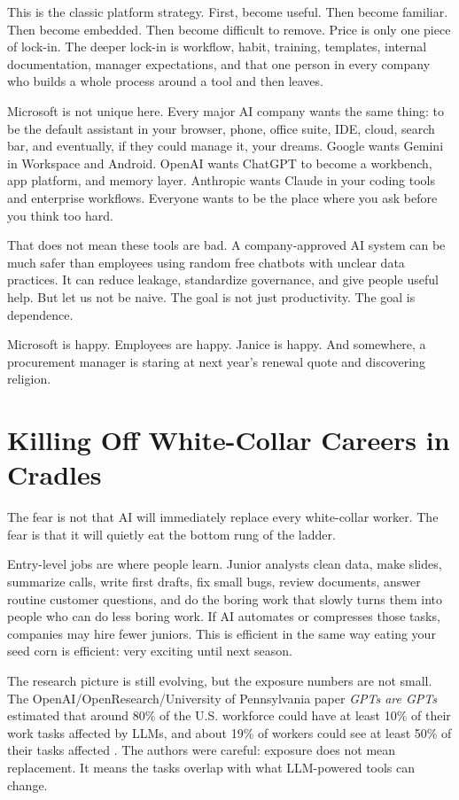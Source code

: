 \documentclass[12pt,oneside]{book}
\begin{document}
This is the classic platform strategy. First, become useful. Then become familiar. Then become embedded. Then become difficult to remove. Price is only one piece of lock-in. The deeper lock-in is workflow, habit, training, templates, internal documentation, manager expectations, and that one person in every company who builds a whole process around a tool and then leaves.

Microsoft is not unique here. Every major AI company wants the same thing: to be the default assistant in your browser, phone, office suite, IDE, cloud, search bar, and eventually, if they could manage it, your dreams. Google wants Gemini in Workspace and Android. OpenAI wants ChatGPT to become a workbench, app platform, and memory layer. Anthropic wants Claude in your coding tools and enterprise workflows. Everyone wants to be the place where you ask before you think too hard.

That does not mean these tools are bad. A company-approved AI system can be much safer than employees using random free chatbots with unclear data practices. It can reduce leakage, standardize governance, and give people useful help. But let us not be naive. The goal is not just productivity. The goal is dependence.

Microsoft is happy. Employees are happy. Janice is happy. And somewhere, a procurement manager is staring at next year's renewal quote and discovering religion.

\chapter{Killing Off White-Collar Careers in Cradles}

The fear is not that AI will immediately replace every white-collar worker. The fear is that it will quietly eat the bottom rung of the ladder.

Entry-level jobs are where people learn. Junior analysts clean data, make slides, summarize calls, write first drafts, fix small bugs, review documents, answer routine customer questions, and do the boring work that slowly turns them into people who can do less boring work. If AI automates or compresses those tasks, companies may hire fewer juniors. This is efficient in the same way eating your seed corn is efficient: very exciting until next season.

The research picture is still evolving, but the exposure numbers are not small. The OpenAI/OpenResearch/University of Pennsylvania paper \emph{GPTs are GPTs} estimated that around 80\% of the U.S. workforce could have at least 10\% of their work tasks affected by LLMs, and about 19\% of workers could see at least 50\% of their tasks affected \parencite{eloundou2023}. The authors were careful: exposure does not mean replacement. It means the tasks overlap with what LLM-powered tools can change.
\end{document}
